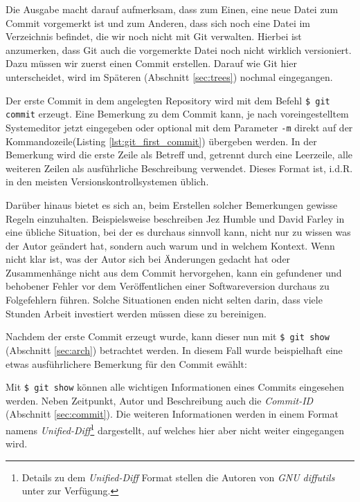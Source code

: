 Die Ausgabe macht darauf aufmerksam, dass zum Einen, eine neue Datei zum Commit
vorgemerkt ist und zum Anderen, dass sich noch eine Datei im Verzeichnis
befindet, die wir noch nicht mit Git verwalten. Hierbei ist anzumerken, dass
Git auch die vorgemerkte Datei noch nicht wirklich versioniert. Dazu müssen wir
zuerst einen Commit erstellen. Darauf wie Git hier unterscheidet, wird im
Späteren (Abschnitt \ref{sec:trees}) nochmal eingegangen.

Der erste Commit in dem angelegten Repository wird mit dem Befehl \texttt{\$
git commit} erzeugt. Eine Bemerkung zu dem Commit kann, je nach
voreingestelltem Systemeditor jetzt eingegeben oder optional mit dem Parameter
\texttt{-m} direkt auf der Kommandozeile(Listing \ref{lst:git_first_commit})
übergeben werden. In der Bemerkung wird die erste Zeile als Betreff und,
getrennt durch eine Leerzeile, alle weiteren Zeilen als ausführliche Beschreibung
verwendet. Dieses Format ist, i.d.R. in den meisten Versionskontrollsystemen
üblich.



Darüber hinaus bietet es sich an, beim Erstellen solcher Bemerkungen gewisse
Regeln einzuhalten. Beispielsweise beschreiben Jez Humble und David Farley in
\cite[S.~37]{cd} eine übliche Situation, bei der es durchaus sinnvoll kann,
nicht nur zu wissen was der Autor geändert hat, sondern auch warum und in
welchem Kontext. Wenn nicht klar ist, was der Autor sich bei Änderungen
gedacht hat oder Zusammenhänge nicht aus dem Commit hervorgehen, kann ein
gefundener und behobener Fehler vor dem Veröffentlichen einer Softwareversion
durchaus zu Folgefehlern führen. Solche Situationen enden nicht selten darin,
dass viele Stunden Arbeit investiert werden müssen diese zu
bereinigen.\cite[S.~37]{cd}

Nachdem der erste Commit erzeugt wurde, kann dieser nun mit \texttt{\$ git
show} (Abschnitt \ref{sec:arch}) betrachtet werden. In diesem Fall wurde
beispielhaft eine etwas ausführlichere Bemerkung für den Commit ewählt:



Mit \texttt{\$ git show} können alle wichtigen Informationen eines Commits
eingesehen werden.  Neben Zeitpunkt, Autor und Beschreibung auch die
\textit{Commit-ID} (Abschnitt \ref{sec:commit}).  Die weiteren Informationen
werden in einem Format namens \textit{Unified-Diff}\footnote{Details zu dem
\textit{Unified-Diff} Format stellen die Autoren von \textit{GNU diffutils}
unter \cite[S.~12-13]{paper:diffutils} zur Verfügung.} dargestellt, auf welches
hier aber nicht weiter eingegangen wird.\cite[25]{gitosp}

